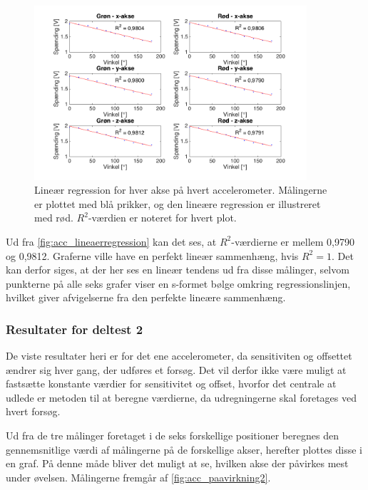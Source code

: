 \begin{figure}[H]
\centering
\includegraphics[width=0.9\textwidth]{figures/lineaerregression}
\caption{Lineær regression for hver akse på hvert accelerometer. Målingerne er plottet med blå prikker, og den lineære regression er illustreret med rød. $R^2$-værdien er noteret for hvert plot.}
\label{fig:acc_lineaerregression}
\end{figure}

Ud fra \autoref{fig:acc_lineaerregression} kan det ses, at $R^2$-værdierne er mellem 0,9790 og 0,9812. Graferne ville have en perfekt lineær sammenhæng, hvis $R^2=1$. Det kan derfor siges, at der her ses en lineær tendens ud fra disse målinger, selvom punkterne på alle seks grafer viser en s-formet bølge omkring regressionslinjen, hvilket giver afvigelserne fra den perfekte lineære sammenhæng.

\subsubsection{Resultater for deltest 2}
De viste resultater heri er for det ene accelerometer, da sensitiviten og offsettet ændrer sig hver gang, der udføres et forsøg. Det vil derfor ikke være muligt at fastsætte konstante værdier for sensitivitet og offset, hvorfor det centrale at udlede er metoden til at beregne værdierne, da udregningerne skal foretages ved hvert forsøg.

Ud fra de tre målinger foretaget i de seks forskellige positioner beregnes den gennemsnitlige værdi af målingerne på de forskellige akser, herefter plottes disse i en graf. På denne måde bliver det muligt at se, hvilken akse der påvirkes mest under øvelsen. Målingerne fremgår af \autoref{fig:acc_paavirkning2}. 

